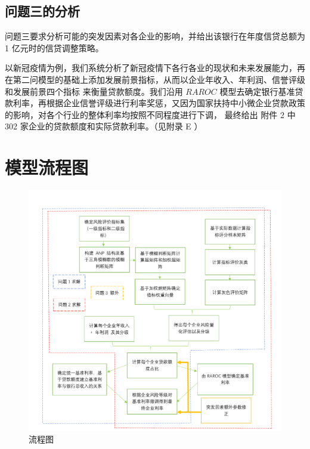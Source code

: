 \documentclass[withoutpreface,bwprint]{cumcmthesis}
\begin{document}
    \subsection{问题三的分析}
        问题三要求分析可能的突发因素对各企业的影响，并给出该银行在年度信贷总额为 1 亿元时的信贷调整策略。\par
        以新冠疫情为例，我们系统分析了新冠疫情下各行各业的现状和未来发展能力，再在第二问模型的基础上添加发展前景指标，从而以企业年收入、年利润、信誉评级和发展前景四个指标
        来衡量贷款额度。我们沿用 $RAROC$ 模型去确定银行基准贷款利率，再根据企业信誉评级进行利率奖惩，又因为国家扶持中小微企业贷款政策的影响，对各个行业的整体利率均按照不同程度进行下调，
        最终给出 附件 2 中 302 家企业的贷款额度和实际贷款利率。（见附录 E ）        
    
    \section{模型流程图}
    \begin{figure}[H]
        \begin{center}
            \includegraphics[width = 1.0\textwidth, height = 0.5\textheight]{流程图.pdf}
            \caption{流程图}
        \end{center}
    \end{figure} 
\end{document}
